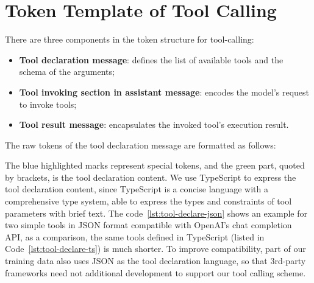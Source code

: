 \section{Token Template of Tool Calling}
\label{sec:tool-call-token-template}

There are three components in the token structure for tool-calling:
\begin{itemize}
    \item \textbf{Tool declaration message}: defines the list of available tools and the schema of the arguments;
    \item \textbf{Tool invoking section in assistant message}: encodes the model's request to invoke tools; 
    \item \textbf{Tool result message}: encapsulates the invoked tool's execution result.
\end{itemize}


\lstset{style=mystyle}


The raw tokens of the tool declaration message are formatted as follows:

\begin{center}
\end{center}

The blue highlighted marks represent special tokens, and the green part, quoted by brackets, is the tool declaration content.
We use TypeScript to express the tool declaration content, since TypeScript is a concise language with a comprehensive type system, able to express the types and constraints of tool parameters with brief text. The code~\ref{lst:tool-declare-json} shows
an example for two simple tools in JSON format compatible with OpenAI's chat completion API, as a comparison, the same tools defined in TypeScript (listed in Code~\ref{lst:tool-declare-ts}) is much shorter.
To improve compatibility, part of our training data also uses JSON as the tool declaration language, so that 3rd-party frameworks need not additional development to support our tool calling scheme.

